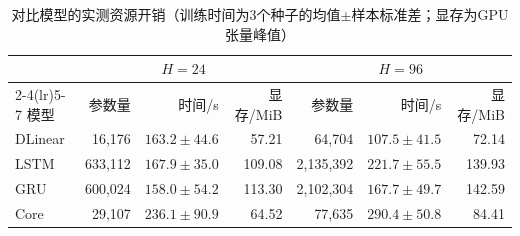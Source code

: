 \begin{table}[t]
\centering
\caption{对比模型的实测资源开销（训练时间为3个种子的均值$\pm$样本标准差；显存为GPU张量峰值）}
\label{tab:efficiency}
\vspace{4pt}
\small\setlength{\tabcolsep}{7pt}
\begin{tabular}{lrrrrrr}\toprule
 & \multicolumn{3}{c}{$H=24$} & \multicolumn{3}{c}{$H=96$}\\
\cmidrule(lr){2-4}\cmidrule(lr){5-7}
模型 & 参数量 & 时间/s & 显存/MiB & 参数量 & 时间/s & 显存/MiB\\\midrule
DLinear & 16,176 & $163.2\pm44.6$ & 57.21 & 64,704 & $107.5\pm41.5$ & 72.14\\
LSTM & 633,112 & $167.9\pm35.0$ & 109.08 & 2,135,392 & $221.7\pm55.5$ & 139.93\\
GRU & 600,024 & $158.0\pm54.2$ & 113.30 & 2,102,304 & $167.7\pm49.7$ & 142.59\\
Core & 29,107 & $236.1\pm90.9$ & 64.52 & 77,635 & $290.4\pm50.8$ & 84.41\\
\bottomrule\end{tabular}
\end{table}